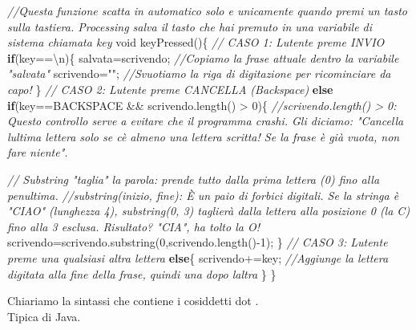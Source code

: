 \documentclass[
]{article}
\newenvironment{Shaded}{}{}
\newcommand{\CharTok}[1]{\textcolor[rgb]{0.25,0.44,0.63}{#1}}
\newcommand{\CommentTok}[1]{\textcolor[rgb]{0.38,0.63,0.69}{\textit{#1}}}
\newcommand{\ControlFlowTok}[1]{\textcolor[rgb]{0.00,0.44,0.13}{\textbf{#1}}}
\newcommand{\DataTypeTok}[1]{\textcolor[rgb]{0.56,0.13,0.00}{#1}}
\newcommand{\DecValTok}[1]{\textcolor[rgb]{0.25,0.63,0.44}{#1}}
\newcommand{\FunctionTok}[1]{\textcolor[rgb]{0.02,0.16,0.49}{#1}}
\newcommand{\NormalTok}[1]{#1}
\newcommand{\OperatorTok}[1]{\textcolor[rgb]{0.40,0.40,0.40}{#1}}
\newcommand{\StringTok}[1]{\textcolor[rgb]{0.25,0.44,0.63}{#1}}
\begin{document}
\begin{Shaded}
\begin{Highlighting}[]
\CommentTok{//Questa funzione scatta in automatico solo e unicamente quando premi un tasto sulla tastiera. Processing salva il tasto che hai premuto in una variabile di sistema chiamata \textquotesingle{}key\textquotesingle{}}
\DataTypeTok{void} \FunctionTok{keyPressed}\OperatorTok{()\{}
    \CommentTok{// CASO 1: L\textquotesingle{}utente preme INVIO}
    \ControlFlowTok{if}\OperatorTok{(}\NormalTok{key}\OperatorTok{==}\CharTok{\textquotesingle{}\textbackslash{}n\textquotesingle{}}\OperatorTok{)\{}
\NormalTok{      salvata}\OperatorTok{=}\NormalTok{scrivendo}\OperatorTok{;} \CommentTok{//Copiamo la frase attuale dentro la variabile "salvata"}
\NormalTok{      scrivendo}\OperatorTok{=}\StringTok{""}\OperatorTok{;} 	 \CommentTok{//Svuotiamo la riga di digitazione per ricominciare da capo!}
    \OperatorTok{\}}
    \CommentTok{// CASO 2: L\textquotesingle{}utente preme CANCELLA (Backspace)}
    \ControlFlowTok{else} \ControlFlowTok{if}\OperatorTok{(}\NormalTok{key}\OperatorTok{==}\NormalTok{BACKSPACE }\OperatorTok{\&\&}\NormalTok{ scrivendo}\OperatorTok{.}\FunctionTok{length}\OperatorTok{()} \OperatorTok{\textgreater{}} \DecValTok{0}\OperatorTok{)\{}
\CommentTok{//scrivendo.length() \textgreater{} 0: Questo controllo serve a evitare che il programma crashi. Gli diciamo: "Cancella l\textquotesingle{}ultima lettera solo se c\textquotesingle{}è almeno una lettera scritta! Se la frase è già vuota, non fare niente".}
        
      \CommentTok{// Substring "taglia" la parola: prende tutto dalla prima lettera (0) fino alla penultima.}
\CommentTok{//substring(inizio, fine): È un paio di forbici digitali. Se la stringa è "CIAO" (lunghezza 4), substring(0, 3) taglierà dalla lettera alla posizione 0 (la C) fino alla 3 esclusa. Risultato? "CIA", ha tolto la O!}
\NormalTok{      scrivendo}\OperatorTok{=}\NormalTok{scrivendo}\OperatorTok{.}\FunctionTok{substring}\OperatorTok{(}\DecValTok{0}\OperatorTok{,}\NormalTok{scrivendo}\OperatorTok{.}\FunctionTok{length}\OperatorTok{(){-}}\DecValTok{1}\OperatorTok{);}
    \OperatorTok{\}}
    \CommentTok{// CASO 3: L\textquotesingle{}utente preme una qualsiasi altra lettera}
    \ControlFlowTok{else}\OperatorTok{\{}
\NormalTok{      scrivendo}\OperatorTok{+=}\NormalTok{key}\OperatorTok{;} \CommentTok{//Aggiunge la lettera digitata alla fine della frase, quindi una dopo l\textquotesingle{}altra}
    \OperatorTok{\}}
\OperatorTok{\}}
\end{Highlighting}
\end{Shaded}

Chiariamo la sintassi che contiene i cosiddetti dot
\textquotesingle.\textquotesingle{}\\
Tipica di Java.
\end{document}
